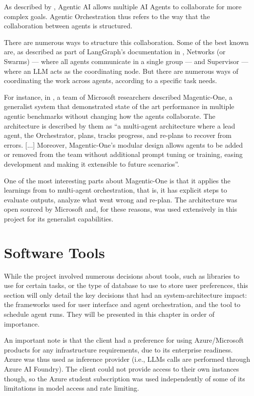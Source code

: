 \documentclass[a4paper]{report}
\begin{document}
As described by \cite{sapkota2025aiagentsvsagentic}, Agentic AI allows multiple AI Agents to collaborate for more complex goals. Agentic Orchestration thus refers to the way that the collaboration between agents is structured.

There are numerous ways to structure this collaboration. Some of the best known are, as described as part of LangGraph's documentation in \cite{langgraphagmultiagentsystems}, Networks (or Swarms) --- where all agents communicate in a single group --- and Supervisor --- where an LLM acts as the coordinating node. But there are numerous ways of coordinating the work across agents, according to a specific task needs.

For instance, in \cite{fourney2024magenticone}, a team of Microsoft researchers described Magentic-One, a generalist system that demonstrated state of the art performance in multiple agentic benchmarks without changing how the agents collaborate. The architecture is described by them as ``a multi-agent architecture where a lead agent, the Orchestrator, plans, tracks progress, and re-plans to recover from errors. [...] Moreover, Magentic-One's modular design allows agents to be added or removed from the team without additional prompt tuning or training, easing development and making it extensible to future scenarios''.

One of the most interesting parts about Magentic-One is that it applies the learnings from \cite{shinn2023reflexion} to multi-agent orchestration, that is, it has explicit steps to evaluate  outputs, analyze what went wrong and re-plan. The architecture was open sourced by Microsoft and, for these reasons, was used extensively in this project for its generalist capabilities.

\section{Software Tools}
\label{sec:research-tools}

While the project involved numerous decisions about tools, such as libraries to use for certain tasks, or the type of database to use to store user preferences, this section will only detail the key decisions that had an system-architecture impact: the frameworks used for user interface and agent orchestration, and the tool to schedule agent runs. They will be presented in this chapter in order of importance.

An important note is that the client had a preference for using Azure/Microsoft products for any infrastructure requirements, due to its enterprise readiness. Azure was thus used as inference provider (i.e., LLMs calls are performed through Azure AI Foundry). The client could not provide access to their own instances though, so the Azure student subscription was used independently of some of its limitations in model access and rate limiting.
\end{document}
